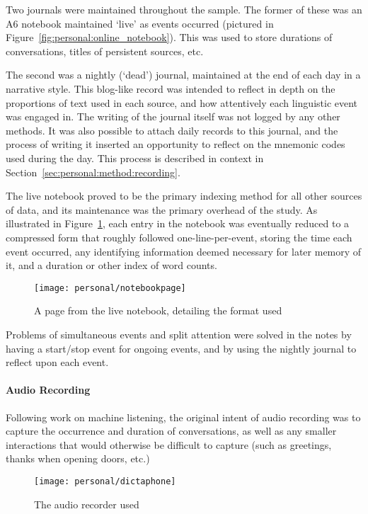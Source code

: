 Two journals were maintained throughout the sample.  The former of these was an A6 notebook maintained `live' as events occurred (pictured in Figure~\ref{fig:personal:online_notebook}).  This was used to store durations of conversations, titles of persistent sources, etc.

The second was a nightly (`dead') journal, maintained at the end of each day in a narrative style.  This blog-like record was intended to reflect in depth on the proportions of text used in each source, and how attentively each linguistic event was engaged in.  The writing of the journal itself was not logged by any other methods.  It was also possible to attach daily records to this journal, and the process of writing it inserted an opportunity to reflect on the mnemonic codes used during the day.  This process is described in context in Section~\ref{sec:personal:method:recording}.

The live notebook proved to be the primary indexing method for all other sources of data, and its maintenance was the primary overhead of the study.  As illustrated in Figure~\ref{fig:personal:notebookformat}, each entry in the notebook was eventually reduced to a compressed form that roughly followed one-line-per-event, storing the time each event occurred, any identifying information deemed necessary for later memory of it, and a duration or other index of word counts.

\begin{figure}[ht]
    \centering
    \texttt{[image: personal/notebookpage]}
    \caption{A page from the live notebook, detailing the format used}
    \label{fig:personal:notebookformat}
\end{figure}


Problems of simultaneous events and split attention were solved in the notes by having a start/stop event for ongoing events, and by using the nightly journal to reflect upon each event.

\paragraph{Audio Recording}
Following work on machine listening, the original intent of audio recording was to capture the occurrence and duration of conversations, as well as any smaller interactions that would otherwise be difficult to capture (such as greetings, thanks when opening doors, etc.)


\begin{figure}[ht]
    \centering
    \texttt{[image: personal/dictaphone]}
    \caption{The audio recorder used}
    \label{fig:personal:audiorecorder}
\end{figure}



